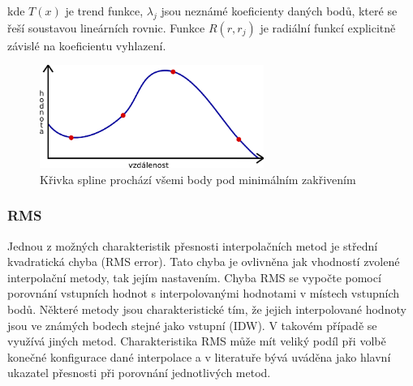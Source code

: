\documentclass[a4paper,12pt,oneside]{report}
\begin{document}
kde $T(x)$ je trend funkce, $\lambda_{j}$ jsou neznámé koeficienty daných bodů, které se řeší soustavou lineárních rovnic. Funkce $R(r,r_{j})$ je radiální funkcí explicitně závislé na koeficientu vyhlazení. \cite{RST}


\begin{figure}[h!]
    \centering
    \includegraphics[width=0.65\textwidth]{./img/interpolace/spline.png}
    \caption[Spline interpol.]{\centering  Křivka spline prochází všemi body pod minimálním zakřivením }
 \end{figure}   


\subsubsection{RMS}
Jednou z možných charakteristik přesnosti interpolačních metod je střední kvadratická chyba (RMS error). Tato chyba je ovlivněna jak vhodností zvolené interpolační metody, tak jejím nastavením. Chyba RMS se vypočte pomocí porovnání vstupních hodnot s interpolovanými hodnotami v místech vstupních bodů. Některé metody jsou charakteristické tím, že jejich interpolované hodnoty jsou ve známých bodech stejné jako vstupní (IDW). V takovém případě se využívá jiných metod. Charakteristika RMS může mít veliký podíl při volbě konečné konfigurace dané interpolace a v literatuře bývá uváděna jako hlavní ukazatel přesnosti při porovnání jednotlivých metod.


















\newpage
\setcounter{footnote}{1}
\end{document}
